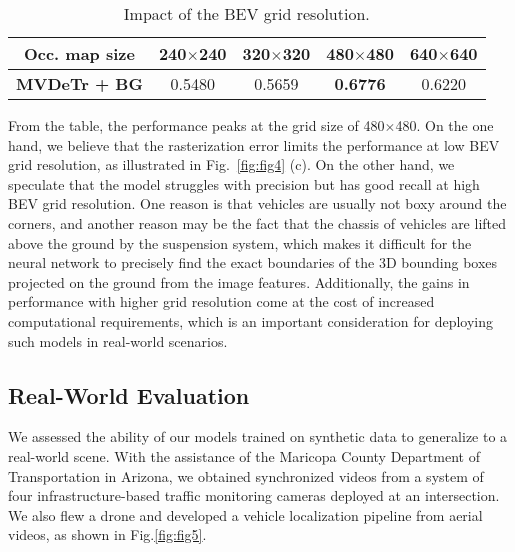 \begin{table}[h!]

\centering
\begin{tabular}{c|c|c|c|c}
\hline
\textbf{Occ. map size} & 240$\times$240 & 320$\times$320 & 480$\times$480 & 640$\times$640 \\ \hline
\textbf{MVDeTr + BG}      & 0.5480  & 0.5659  & \textbf{0.6776}  & 0.6220  \\ \hline
\end{tabular}
\caption{Impact of the BEV grid resolution.}
\label{tab:grid_results}
\vspace{-0.2in}
\end{table}

From the table, the performance peaks at the grid size of 480$\times$480. On the one hand, we believe that the rasterization error limits the performance at low BEV grid resolution, as illustrated in Fig.~\ref{fig:fig4} (c). On the other hand, we speculate that the model struggles with precision but has good recall at high BEV grid resolution. One reason is that vehicles are usually not boxy around the corners, and another reason may be the fact that the chassis of vehicles are lifted above the ground by the suspension system, which makes it difficult for the neural network to precisely find the exact boundaries of the 3D bounding boxes projected on the ground from the image features. Additionally, the gains in performance with higher grid resolution come at the cost of increased computational requirements, which is an important consideration for deploying such models in real-world scenarios.

\subsection{Real-World Evaluation}

We assessed the ability of our models trained on synthetic data to generalize to a real-world scene. With the assistance of the Maricopa County Department of Transportation in Arizona, we obtained synchronized videos from a system of four infrastructure-based traffic monitoring cameras \cite{lu2021carom} deployed at an intersection. We also flew a drone and developed a vehicle localization pipeline \cite{lu2023carom} from aerial videos, as shown in Fig.\ref{fig:fig5}.

